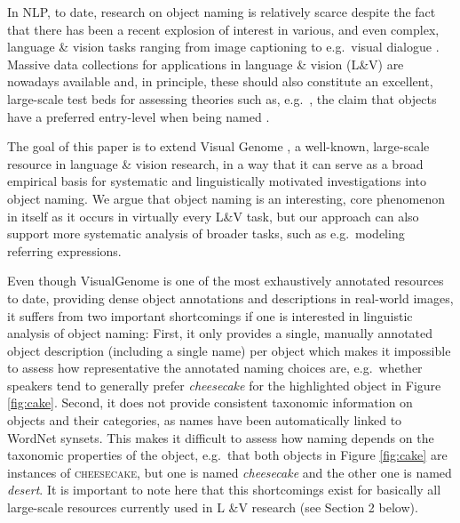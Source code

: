 \documentclass[11pt]{article}
\newcommand{\refexp}[1]{\textsl{#1}}
\newcommand{\cat}[1]{\textsc{#1}}
\begin{document}
In NLP, to date, research on object naming is relatively scarce despite the fact that
 there has been a recent explosion of interest in various, and even complex, language \& vision tasks ranging from image captioning \cite{fangetal:2015,devlin:imcaqui,Bernardietal:automatic} to e.g.\ visual dialogue \cite{das2017visual,vries2017guesswhat}. Massive data collections for applications in language \& vision (L\&V) are nowadays available and, in principle, these should also constitute an excellent, large-scale test beds for assessing  theories such as, e.g.\ , the claim that objects have a preferred entry-level when being named  \cite{rosch1976basic}.

The goal of this paper is to extend Visual Genome  \cite{krishna2016visualgenome}, a well-known, large-scale resource in language \& vision research, in a way that it can serve as a broad empirical basis for systematic and linguistically motivated investigations into object naming. 
We argue that object naming is an interesting, core phenomenon in itself as it occurs in virtually every L\&V task, but our approach can also support more systematic analysis of broader tasks, such as e.g.\ modeling referring expressions.

Even though VisualGenome is one of the most exhaustively annotated resources to date, providing dense object annotations and descriptions in real-world images, it suffers from two important shortcomings if one is interested in linguistic analysis of object naming:  
First, it only provides a single, manually annotated object description (including a single name) per object which makes it impossible to assess how representative the annotated naming choices are, e.g.\ whether speakers tend to generally prefer \refexp{cheesecake} for the highlighted object in Figure \ref{fig:cake}.
Second, it does not provide consistent taxonomic information on objects and their categories, as names have been automatically linked to WordNet synsets. 
This makes it difficult to assess how naming depends on the taxonomic properties of the object, e.g.\  that both objects in Figure \ref{fig:cake} are instances of \cat{cheesecake}, but one is named \refexp{cheesecake} and the other one is named \refexp{desert}. It is important to note here that this shortcomings exist for basically all large-scale resources currently used in L \&V research (see Section 2 below).
\end{document}
